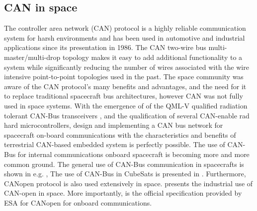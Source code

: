 \documentclass[a4paper,twocolumn]{esapub2005} %
\begin{document}
\subsection{CAN in space}
 The controller area network (CAN) protocol is a highly reliable communication system for harsh environments and has been used in automotive and industrial applications since its presentation in 1986. The CAN two-wire bus multi-master/multi-drop topology makes it easy to add additional functionality to a system while significantly reducing the number of wires associated with the wire intensive point-to-point topologies used in the past. The space community was aware of the CAN protocol’s many benefits and advantages, and the need for it to replace traditional spacecraft bus architectures, however CAN was not fully used in space systems. With the emergence of of the QML-V qualified radiation tolerant CAN-Bus transceivers \cite{COBHAM}, and the qualification of several CAN-enable rad hard microcontrollers, design and implementing a CAN bus network for spacecraft on-board communications with the characteristics and benefits of terrestrial CAN-based embedded system is perfectly possible. The use of CAN-Bus for internal communications onboard spacecraft is becoming more and more common ground. The general use of CAN-Bus communication in spacecrafts is shown in e.g. \cite{CANBUS1}, The use of CAN-Bus in CubeSats is presented in \cite{CANBUS2}. Furthermore, CANopen protocol is also used extensively in space. \cite{RENESAS_CAN_Open} presents the industrial use of CAN-open in space. More importantly, \cite{ESA_CAN_Open} is the official specification provided by ESA for CANopen for onboard communications.
\end{document}
